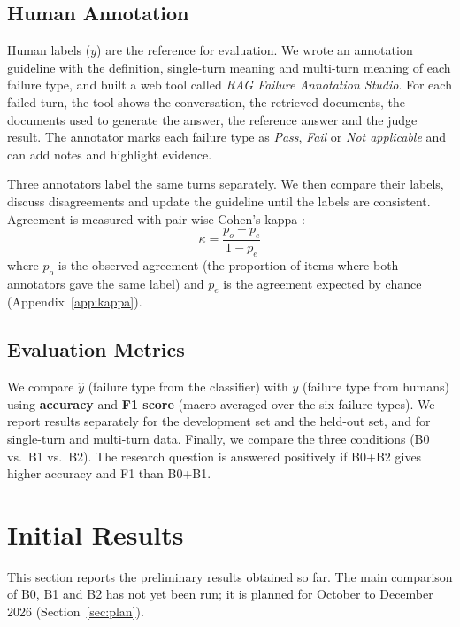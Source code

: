 \documentclass[11pt]{article}
\begin{document}
\subsection{Human Annotation}
Human labels ($y$) are the reference for evaluation. We wrote an annotation guideline with the definition, single-turn meaning and multi-turn meaning of each failure type, and built a web tool called \emph{RAG Failure Annotation Studio}. For each failed turn, the tool shows the conversation, the retrieved documents, the documents used to generate the answer, the reference answer and the judge result. The annotator marks each failure type as \emph{Pass}, \emph{Fail} or \emph{Not applicable} and can add notes and highlight evidence.

Three annotators label the same turns separately. We then compare their labels, discuss disagreements and update the guideline until the labels are consistent. Agreement is measured with pair-wise Cohen's kappa \citep{cohen1960}:
\begin{equation}
\kappa = \frac{p_o - p_e}{1 - p_e}
\end{equation}
where $p_o$ is the observed agreement (the proportion of items where both annotators gave the same label) and $p_e$ is the agreement expected by chance (Appendix~\ref{app:kappa}).

\subsection{Evaluation Metrics}
We compare $\hat{y}$ (failure type from the classifier) with $y$ (failure type from humans) using \textbf{accuracy} and \textbf{F1 score} (macro-averaged over the six failure types). We report results separately for the development set and the held-out set, and for single-turn and multi-turn data. Finally, we compare the three conditions (B0 vs.\ B1 vs.\ B2). The research question is answered positively if B0+B2 gives higher accuracy and F1 than B0+B1.

\section{Initial Results}
\label{sec:results}
This section reports the preliminary results obtained so far. The main comparison of B0, B1 and B2 has not yet been run; it is planned for October to December 2026 (Section~\ref{sec:plan}).
\end{document}
